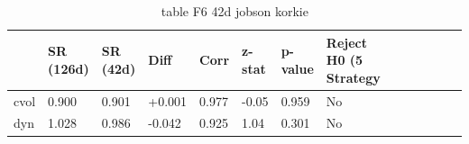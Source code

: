 \begin{table}[htbp]
  \centering
  \caption{table F6 42d jobson korkie}
  \label{tab:table_F6_42d_jobson_korkie}
  \begin{tabular}{llllllll}
\toprule
 & SR (126d) & SR (42d) & Diff & Corr & z-stat & p-value & Reject H0 (5%
Strategy &  &  &  &  &  &  &  \\
\midrule
cvol & 0.900 & 0.901 & +0.001 & 0.977 & -0.05 & 0.959 & No \\
dyn & 1.028 & 0.986 & -0.042 & 0.925 & 1.04 & 0.301 & No \\
\bottomrule
\end{tabular}

\end{table}
